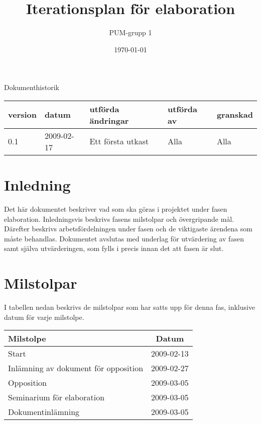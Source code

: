 

\ifpdf
\else
\fi

\title{Iterationsplan för elaboration}
\author{PUM-grupp 1}
\date{\today}



\maketitle\thispagestyle{empty}
\newpage

{\centering \Large{Dokumenthistorik\\}}

\vspace{10pt}
\begin{tabularx}{\textwidth}{ |l|l|X|l|l| }
  \hline
    \textbf{version} & \textbf{datum} & \textbf{utförda ändringar} & \textbf{utförda av} & \textbf{granskad} \\
	\hline 0.1 & 2009-02-17 & Ett första utkast & Alla & Alla \\
  \hline
\end{tabularx}

\newpage

\setcounter{tocdepth}{2}
\tableofcontents
\newpage

\section{Inledning}
Det här dokumentet beskriver vad som ska göras i projektet under fasen elaboration. Inledningsvis beskrivs fasens milstolpar och övergripande mål. Därefter beskrivs arbetsfördelningen under fasen och de viktigaste ärendena som måste behandlas. Dokumentet avslutas med underlag för utvärdering av fasen samt själva utvärderingen, som fylls i precis innan det att fasen är slut.

\section{Milstolpar}
I tabellen nedan beskrivs de milstolpar som har satts upp för denna fas, inklusive datum för varje milstolpe.

\begin{center}
	\begin{tabular}{| l | c |}
	\hline \textbf{Milstolpe} & \textbf{Datum} \\
	\hline Start & 2009-02-13 \\
	\hline Inlämning av dokument för opposition & 2009-02-27 \\
	\hline Opposition & 2009-03-05 \\
	\hline Seminarium för elaboration & 2009-03-05 \\
	\hline Dokumentinlämning & 2009-03-05 \\
	\hline
	\end{tabular}
\end{center}

